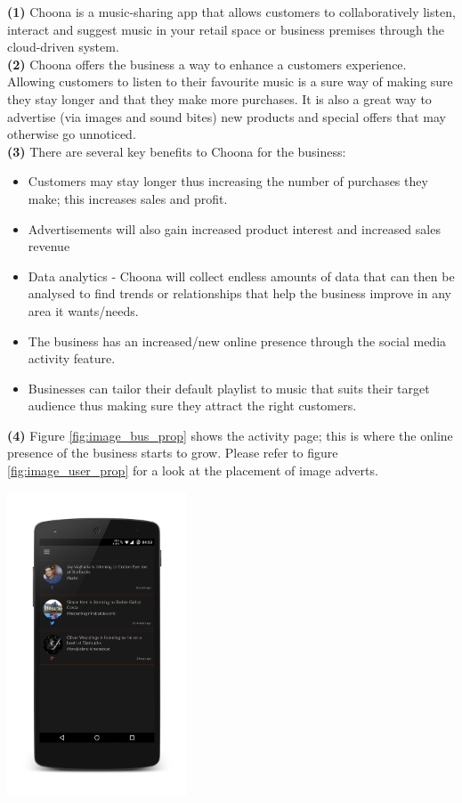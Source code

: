 \textbf{(1)} Choona is a music-sharing app that allows customers to collaboratively listen, interact and suggest music in your retail space or business premises through the cloud-driven system.  \\

\textbf{(2)} Choona offers the business a way to enhance a customers experience.  Allowing customers to listen to their favourite music is a sure way of making sure they stay longer and that they make more purchases.  It is also a great way to advertise (via images and sound bites) new products and special offers that may otherwise go unnoticed.  \\

\textbf{(3)} There are several key benefits to Choona for the business:
\begin{itemize}
\item Customers may stay longer thus increasing the number of purchases they make; this increases sales and profit.
\item Advertisements will also gain increased product interest and increased sales revenue
\item Data analytics - Choona will collect endless amounts of data that can then be analysed to find trends or relationships that help the business improve in any area it wants/needs.  
\item The business has an increased/new online presence through the social media activity feature. 
\item Businesses can tailor their default playlist to music that suits their target audience thus making sure they attract the right customers.
\end{itemize} 

\textbf{(4)} Figure \ref{fig:image_bus_prop} shows the activity page; this is where the online presence of the business starts to grow.  Please refer to figure \ref{fig:image_user_prop} for a look at the placement of image adverts.\\
\begin{minipage}{\linewidth}
\centering
\includegraphics[width=0.4\textwidth]{./img/idea_bus_prop.png}
\label{fig:image_bus_prop}
\end{minipage}\\


